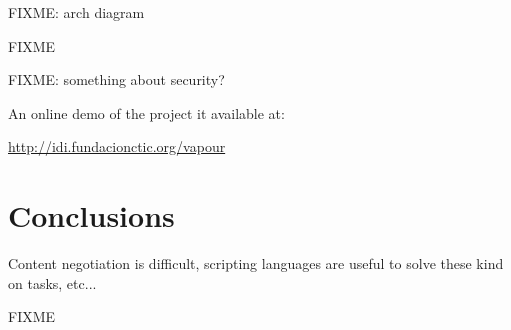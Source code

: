 FIXME: arch diagram

FIXME

FIXME: something about security?

An online demo of the project it available at: 
\begin{center}\url{http://idi.fundacionctic.org/vapour}\end{center}

\section{Conclusions}

Content negotiation is difficult, scripting languages are useful to solve these kind on tasks, etc...

FIXME

